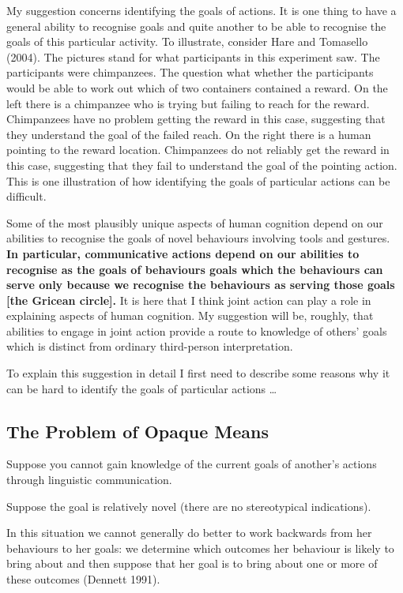 \documentclass[12pt,a4paper]{extarticle}
\begin{document}
My suggestion concerns identifying the goals of actions. 
It is one thing to have a general ability to recognise goals and quite another to be able to recognise the goals of this particular activity.
To illustrate, consider Hare and Tomasello (2004).
The pictures stand for what participants in this experiment saw.
The participants were chimpanzees.
The question what whether the participants would be able to work out which of two containers contained a reward.
On the left there is a chimpanzee who is trying but failing to reach for the reward. 
Chimpanzees have no problem getting the reward in this case, suggesting that they understand the goal of the failed reach.
On the right there is a human pointing to the reward location.
Chimpanzees do not reliably  get the reward in this case, suggesting that they fail to understand the goal of the pointing action.
This is one illustration of how identifying the goals of particular actions can be difficult.
 
Some of the most plausibly unique aspects of human cognition depend on our abilities to recognise the goals of novel behaviours involving tools and gestures.  
\textbf{In particular, communicative actions depend on our abilities to recognise as the goals of behaviours goals which the behaviours can serve only because we recognise the behaviours as serving those goals [the Gricean circle].}
It is here that I think joint action can play a role in explaining aspects of human cognition.  
My suggestion will be, roughly, that abilities to engage in joint action provide a route to knowledge of others’ goals which is distinct from ordinary third-person interpretation.  

To explain this suggestion in detail I first need to describe some reasons why it can be hard to identify the goals of particular actions …


\subsection{The Problem of Opaque Means}

Suppose you cannot gain knowledge of the current goals of another's actions through linguistic communication.

Suppose the goal is relatively novel (there are no stereotypical indications).

In this situation we cannot generally do better to work backwards from her behaviours to her goals: we determine which outcomes her behaviour is likely to bring about and then suppose that her goal is to bring about one or more of these outcomes (Dennett 1991).  
\end{document}
